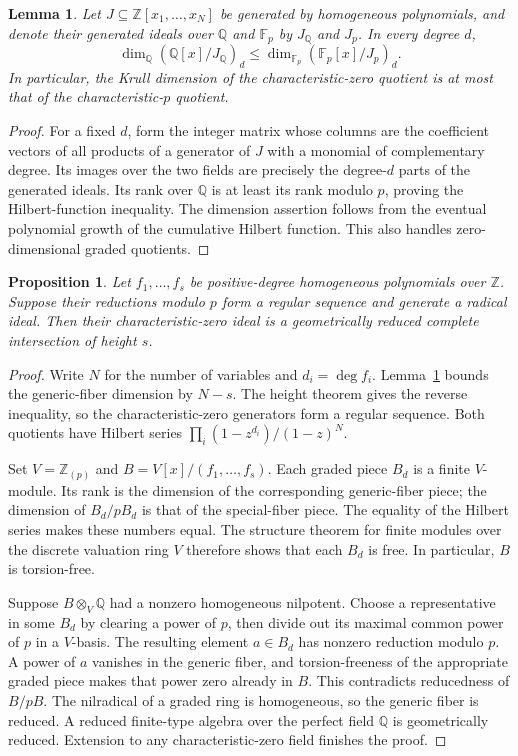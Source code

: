 \documentclass[11pt]{article}
\newtheorem{proposition}[theorem]{Proposition}
\newtheorem{lemma}[theorem]{Lemma}
\theoremstyle{definition}\newtheorem{definition}[theorem]{Definition}
\theoremstyle{remark}\newtheorem{remark}[theorem]{Remark}
\newcommand{\F}{\mathbb F}
\newcommand{\Q}{\mathbb Q}
\newcommand{\Z}{\mathbb Z}
\numberwithin{equation}{section}
\begin{document}
\begin{lemma}\label{lem:specialization}
Let $J\subseteq\Z[x_1,\ldots,x_N]$ be generated by homogeneous
polynomials, and denote their generated ideals over $\Q$ and
$\F_p$ by $J_{\Q}$ and $J_p$. In every degree $d$,
\[
 \dim_{\Q}(\Q[x]/J_{\Q})_d
 \le\dim_{\F_p}(\F_p[x]/J_p)_d.
\]
In particular, the Krull dimension of the characteristic-zero
quotient is at most that of the characteristic-$p$ quotient.
\end{lemma}
\begin{proof}
For a fixed $d$, form the integer matrix whose columns are the
coefficient vectors of all products of a generator of $J$ with a
monomial of complementary degree. Its images over the two fields
are precisely the degree-$d$ parts of the generated ideals. Its rank
over $\Q$ is at least its rank modulo $p$, proving the Hilbert-function
inequality. The dimension assertion follows from the eventual
polynomial growth of the cumulative Hilbert function. This also
handles zero-dimensional graded quotients.
\end{proof}

\begin{proposition}\label{prop:lift}
Let $f_1,\ldots,f_s$ be positive-degree homogeneous polynomials over
$\Z$. Suppose their reductions modulo $p$ form a regular sequence
and generate a radical ideal. Then their characteristic-zero ideal
is a geometrically reduced complete intersection of height $s$.
\end{proposition}
\begin{proof}
Write $N$ for the number of variables and $d_i=\deg f_i$.
Lemma~\ref{lem:specialization} bounds the generic-fiber dimension
by $N-s$. The height theorem gives the reverse inequality, so the
characteristic-zero generators form a regular sequence. Both
quotients have Hilbert series
$\prod_i(1-z^{d_i})/(1-z)^N$.

Set $V=\Z_{(p)}$ and $B=V[x]/(f_1,\ldots,f_s)$.
Each graded piece $B_d$ is a finite $V$-module. Its rank is the
dimension of the corresponding generic-fiber piece; the dimension
of $B_d/pB_d$ is that of the special-fiber piece. The equality of
the Hilbert series makes these numbers equal. The structure theorem
for finite modules over the discrete valuation ring $V$ therefore
shows that each $B_d$ is free. In particular, $B$ is torsion-free.

Suppose $B\otimes_V\Q$ had a nonzero homogeneous nilpotent.
Choose a representative in some $B_d$ by clearing a power of $p$,
then divide out its maximal common power of $p$ in a $V$-basis.
The resulting element $a\in B_d$ has nonzero reduction modulo $p$.
A power of $a$ vanishes in the generic fiber, and torsion-freeness
of the appropriate graded piece makes that power zero already in
$B$. This contradicts reducedness of $B/pB$. The nilradical of a
graded ring is homogeneous, so the generic fiber is reduced.
A reduced finite-type algebra over the perfect field $\Q$ is
geometrically reduced. Extension to any characteristic-zero field
finishes the proof.
\end{proof}
\end{document}
